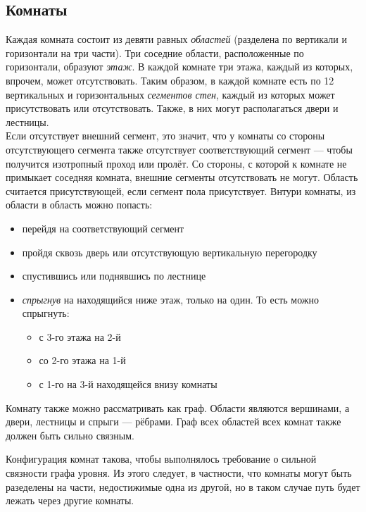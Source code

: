 \documentclass[12pt,a4paper,fullpage]{article}
\begin{document}
\subsection{Комнаты}
Каждая комната состоит из девяти равных \textit{областей} (разделена по вертикали и горизонтали на три части). Три соседние области, расположенные по горизонтали, образуют \textit{этаж}. В каждой комнате три этажа, каждый из которых, впрочем, может отсутствовать.
Таким образом, в каждой комнате есть по 12 вертикальных и горизонтальных \textit{сегментов стен}, каждый из которых может присутствовать или отсутствовать. Также, в них могут располагаться двери и лестницы.\\
Если отсутствует внешний сегмент, это значит, что у комнаты со стороны отсутствующего сегмента также отсутствует соответствующий сегмент --- чтобы получится изотропный проход или пролёт. Со стороны, с которой к комнате не примыкает соседняя комната, внешние сегменты отсутствовать не могут.
Область считается присутствующей, если сегмент пола присутствует.
Внтури комнаты, из области в область можно попасть:
\begin{itemize}
\item перейдя на соответствующий сегмент
\item пройдя сквозь дверь или отсутствующую вертикальную перегородку
\item спустившись или поднявшись по лестнице
\item \textit{спрыгнув} на находящийся ниже этаж, только на один. То есть можно спрыгнуть:
  \begin{itemize}
  \item с 3-го этажа на 2-й
  \item со 2-го этажа на 1-й
  \item с 1-го на 3-й находящейся внизу комнаты
  \end{itemize}
\end{itemize}

Комнату также можно рассматривать как граф. Области являются вершинами, а двери, лестницы и спрыги --- рёбрами. Граф всех областей всех комнат также должен быть сильно связным.\\
\noindent {}
\noindent {}
\noindent {}

Конфигурация комнат такова, чтобы выполнялось требование о сильной связности графа уровня. Из этого следует, в частности, что комнаты могут быть разеделены на части, недостижимые одна из другой, но в таком случае путь будет лежать через другие комнаты.
\end{document}
